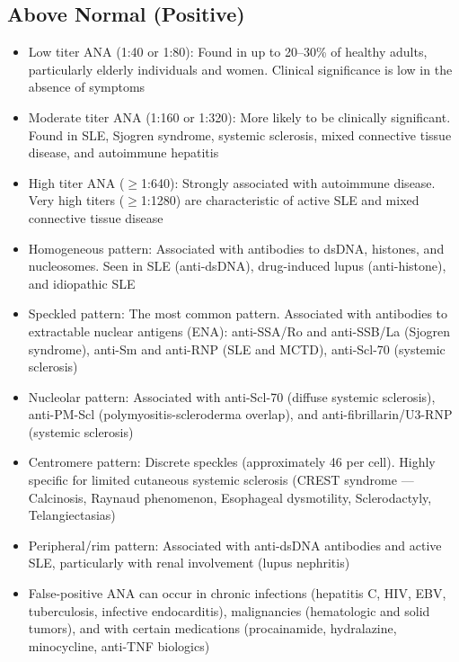 \subsection*{Above Normal (Positive)}
\begin{itemize}
  \item Low titer ANA (1:40 or 1:80): Found in up to 20--30\% of healthy adults, particularly elderly individuals and women. Clinical significance is low in the absence of symptoms
  \item Moderate titer ANA (1:160 or 1:320): More likely to be clinically significant. Found in SLE, Sjogren syndrome, systemic sclerosis, mixed connective tissue disease, and autoimmune hepatitis
  \item High titer ANA ($\geq$1:640): Strongly associated with autoimmune disease. Very high titers ($\geq$1:1280) are characteristic of active SLE and mixed connective tissue disease
  \item Homogeneous pattern: Associated with antibodies to dsDNA, histones, and nucleosomes. Seen in SLE (anti-dsDNA), drug-induced lupus (anti-histone), and idiopathic SLE
  \item Speckled pattern: The most common pattern. Associated with antibodies to extractable nuclear antigens (ENA): anti-SSA/Ro and anti-SSB/La (Sjogren syndrome), anti-Sm and anti-RNP (SLE and MCTD), anti-Scl-70 (systemic sclerosis)
  \item Nucleolar pattern: Associated with anti-Scl-70 (diffuse systemic sclerosis), anti-PM-Scl (polymyositis-scleroderma overlap), and anti-fibrillarin/U3-RNP (systemic sclerosis)
  \item Centromere pattern: Discrete speckles (approximately 46 per cell). Highly specific for limited cutaneous systemic sclerosis (CREST syndrome --- Calcinosis, Raynaud phenomenon, Esophageal dysmotility, Sclerodactyly, Telangiectasias)
  \item Peripheral/rim pattern: Associated with anti-dsDNA antibodies and active SLE, particularly with renal involvement (lupus nephritis)
  \item False-positive ANA can occur in chronic infections (hepatitis C, HIV, EBV, tuberculosis, infective endocarditis), malignancies (hematologic and solid tumors), and with certain medications (procainamide, hydralazine, minocycline, anti-TNF biologics)
\end{itemize}

